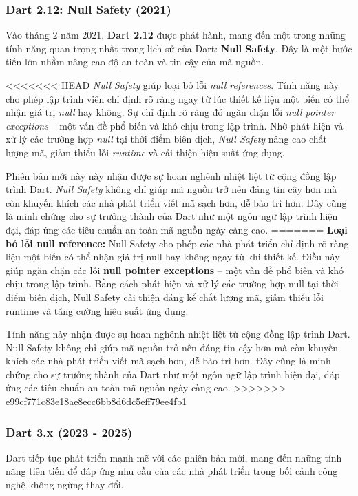 \documentclass[../DoAn.tex]{subfiles}
\numberwithin{figure}{chapter}
\begin{document}
\subsubsection{Dart 2.12: Null Safety (2021)}

Vào tháng 2 năm 2021, \textbf{Dart 2.12} được phát hành, mang đến một trong những tính năng quan trọng nhất trong lịch sử của Dart: \textbf{Null Safety}. Đây là một bước tiến lớn nhằm nâng cao độ an toàn và tin cậy của mã nguồn.

<<<<<<< HEAD
\textit{Null Safety} giúp loại bỏ lỗi \textit{null references}. Tính năng này cho phép lập trình viên chỉ định rõ ràng ngay từ lúc thiết kế liệu một biến có thể nhận giá trị \textit{null} hay không. Sự chỉ định rõ ràng đó ngăn chặn lỗi \textit{null pointer exceptions} – một vấn đề phổ biến và khó chịu trong lập trình. Nhờ phát hiện và xử lý các trường hợp \textit{null} tại thời điểm biên dịch, \textit{Null Safety} nâng cao chất lượng mã, giảm thiểu lỗi \textit{runtime} và cải thiện hiệu suất ứng dụng.


Phiên bản mới này này nhận được sự hoan nghênh nhiệt liệt từ cộng đồng lập trình Dart. \textit{Null Safety} không chỉ giúp mã nguồn trở nên đáng tin cậy hơn mà còn khuyến khích các nhà phát triển viết mã sạch hơn, dễ bảo trì hơn. Đây cũng là minh chứng cho sự trưởng thành của Dart như một ngôn ngữ lập trình hiện đại, đáp ứng các tiêu chuẩn an toàn mã nguồn ngày càng cao.
=======
    \textbf{Loại bỏ lỗi null reference: } 
    Null Safety cho phép các nhà phát triển chỉ định rõ ràng liệu một biến có thể nhận giá trị null hay không ngay từ khi thiết kế. Điều này giúp ngăn chặn các lỗi \textbf{null pointer exceptions} – một vấn đề phổ biến và khó chịu trong lập trình. Bằng cách phát hiện và xử lý các trường hợp null tại thời điểm biên dịch, Null Safety cải thiện đáng kể chất lượng mã, giảm thiểu lỗi runtime và tăng cường hiệu suất ứng dụng.

Tính năng này nhận được sự hoan nghênh nhiệt liệt từ cộng đồng lập trình Dart. Null Safety không chỉ giúp mã nguồn trở nên đáng tin cậy hơn mà còn khuyến khích các nhà phát triển viết mã sạch hơn, dễ bảo trì hơn. Đây cũng là minh chứng cho sự trưởng thành của Dart như một ngôn ngữ lập trình hiện đại, đáp ứng các tiêu chuẩn an toàn mã nguồn ngày càng cao.
>>>>>>> e99cf771c83e18ae8ecc6bb8d6dc5eff79ee4fb1

\subsubsection{Dart 3.x (2023 - 2025)}
Dart tiếp tục phát triển mạnh mẽ với các phiên bản mới, mang đến những tính năng tiên tiến để đáp ứng nhu cầu của các nhà phát triển trong bối cảnh công nghệ không ngừng thay đổi.
\end{document}
